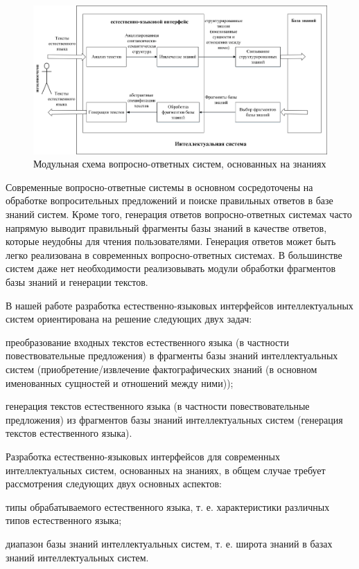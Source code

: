 \begin{figure}[H]
	\includegraphics[scale=0.8,width=1.0\textwidth]{images/part4/chapter_chinese/schema1.png}
	\caption{Модульная схема вопросно-ответных систем, основанных на знаниях}
	\label{fig:schema-natural-interface}
\end{figure}

Современные вопросно-ответные системы в основном сосредоточены на обработке вопросительных предложений и поиске правильных ответов в базе знаний систем. Кроме того, генерация ответов вопросно-ответных системах часто напрямую выводит правильный фрагменты базы знаний в качестве ответов, которые неудобны для чтения пользователями. Генерация ответов может быть легко реализована в современных вопросно-ответных системах. В большинстве систем даже нет необходимости реализовывать  модули обработки фрагментов базы знаний и генерации текстов.

В нашей работе разработка естественно-языковых интерфейсов интеллектуальных систем ориентирована на решение следующих двух задач:
\begin{textitemize}
	\item преобразование входных текстов естественного языка (в частности
	повествовательные предложения) в фрагменты базы знаний интеллектуальных систем (приобретение/извлечение фактографических знаний (в основном именованных сущностей и отношений между ними));
	\item генерация текстов естественного языка (в частности
	повествовательные предложения) из фрагментов базы знаний интеллектуальных систем (генерация текстов естественного языка).
\end{textitemize}

Разработка естественно-языковых интерфейсов для современных интеллектуальных систем, основанных на знаниях, в общем случае требует рассмотрения следующих двух основных аспектов:
\begin{textitemize}
	\item типы обрабатываемого естественного языка, т. е. характеристики различных типов естественного языка;
	\item диапазон базы знаний интеллектуальных систем, т. е. широта знаний в базах знаний интеллектуальных систем.
\end{textitemize}

